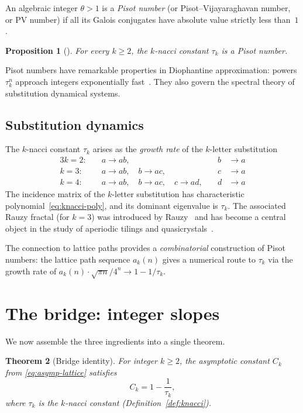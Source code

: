 \documentclass[11pt]{article}
\newtheorem{theorem}{Theorem}[section]
\newtheorem{proposition}[theorem]{Proposition}
\theoremstyle{definition}
\theoremstyle{remark}
\begin{document}
An algebraic integer $\theta > 1$ is a \emph{Pisot number} (or
Pisot--Vijayaraghavan number, or PV number) if all its Galois
conjugates have absolute value strictly less than~$1$.

\begin{proposition}[\cite{Miles1960}]
For every $k \geq 2$, the $k$-nacci constant $\tau_k$ is a
Pisot number.
\end{proposition}

Pisot numbers have remarkable properties in Diophantine approximation:
powers $\tau_k^n$ approach integers exponentially
fast~\cite{DresdenDu2014}.
They also govern the spectral theory of substitution dynamical systems.

\subsection{Substitution dynamics}

The $k$-nacci constant $\tau_k$ arises as the \emph{growth rate} of
the $k$-letter substitution
\begin{alignat*}{3}
k = 2: &\quad a \to ab,\quad & b &\to a \\
k = 3: &\quad a \to ab,\quad b \to ac,\quad & c &\to a \\
k = 4: &\quad a \to ab,\quad b \to ac,\quad c \to ad,\quad & d &\to a
\end{alignat*}
The incidence matrix of the $k$-letter substitution has characteristic
polynomial~\eqref{eq:knacci-poly}, and its dominant eigenvalue is
$\tau_k$.
The associated Rauzy fractal (for $k = 3$) was introduced by
Rauzy~\cite{Rauzy1982} and has become a central object in the study
of aperiodic tilings and quasicrystals~\cite{Fogg2002}.

The connection to lattice paths provides a \emph{combinatorial}
construction of Pisot numbers: the lattice path sequence $a_k(n)$
gives a numerical route to $\tau_k$ via the growth rate of $a_k(n)
\cdot \sqrt{\pi n} / 4^n \to 1 - 1/\tau_k$.

\section{The bridge: integer slopes}\label{sec:bridge}

We now assemble the three ingredients into a single theorem.

\begin{theorem}[Bridge identity]\label{thm:bridge}
For integer $k \geq 2$, the asymptotic constant $C_k$ from
\eqref{eq:asymp-lattice} satisfies
\[
C_k = 1 - \frac{1}{\tau_k},
\]
where $\tau_k$ is the $k$-nacci constant
(Definition~\ref{def:knacci}).
\end{theorem}
\end{document}
